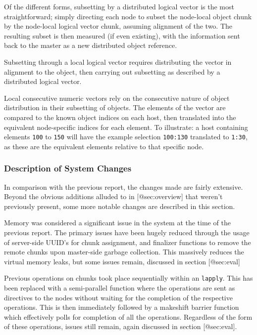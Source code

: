 Of the different forms, subsetting by a distributed logical vector is
the most straightforward; simply directing each node to subset the
node-local object chunk by the node-local logical vector chunk, assuming
alignment of the two. The resulting subset is then measured (if even
existing), with the information sent back to the master as a new
distributed object reference.

Subsetting through a local logical vector requires distributing the
vector in alignment to the object, then carrying out subsetting as
described by a distributed logical vector.

Local consecutive numeric vectors rely on the consecutive nature of
object distribution in their subsetting of objects. The elements of the
vector are compared to the known object indices on each host, then
translated into the equivalent node-specific indices for each element.
To illustrate: a host containing elements \texttt{100} to \texttt{150}
will have the example selection \texttt{100:130} translated to
\texttt{1:30}, as these are the equivalent elements relative to that
specific node.

\hypertarget{description-of-system-changes}{%
\subsubsection{Description of System
Changes}\label{description-of-system-changes}}

In comparison with the previous report, the changes made are fairly
extensive. Beyond the obvious additions alluded to in
{[}@sec:overview{]} that weren't previously present, some more notable
changes are described in this section.

Memory was considered a significant issue in the system at the time of
the previous report. The primary issues have been hugely reduced through
the usage of server-side UUID's for chunk assignment, and finalizer
functions to remove the remote chunks upon master-side garbage
collection. This massively reduces the virtual memory leaks, but some
issues remain, discussed in section {[}@sec:eval{]}

Previous operations on chunks took place sequentially within an
\texttt{lapply}. This has been replaced with a semi-parallel function
where the operations are sent as directives to the nodes without waiting
for the completion of the respective operations. This is then
immediately followed by a makeshift barrier function which effectively
polls for completion of all the operations. Regardless of the form of
these operations, issues still remain, again discussed in section
{[}@sec:eval{]}.

